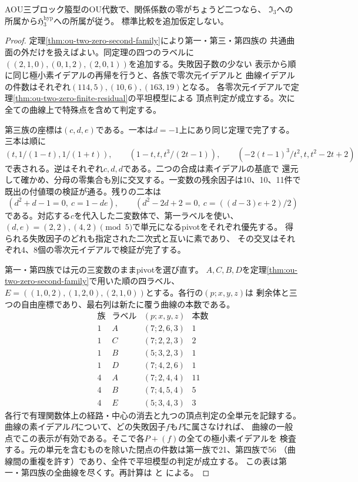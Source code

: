 \begin{theorem}[AOU二零台の全特殊化]
\label{thm:ou-two-zero-all}
AOU三ブロック箙型のOU代数で、関係係数の零がちょうど二つなら、
$\mathfrak I_3$への所属から$\mathfrak H^{\mathrm{hyp}}_3$への所属が従う。
標準比較を追加仮定しない。
\end{theorem}
\begin{proof}
定理\ref{thm:ou-two-zero-second-family}により第一・第三・第四族の
共通曲面の外だけを扱えばよい。同定理の四つのラベルに
$((2,1,0),(0,1,2),(2,0,1))$を追加する。失敗因子数の少ない
表示から順に同じ極小素イデアルの再帰を行うと、各族で零次元イデアルと
曲線イデアルの件数はそれぞれ$(114,5),(10,6),(163,19)$となる。
各零次元イデアルで定理\ref{thm:ou-two-zero-finite-residual}の平坦模型による
頂点判定が成立する。次に全ての曲線上で特殊点を含めて判定する。

第三族の座標は$(c,d,e)$である。一本は$d=-1$上にあり同じ定理で完了する。
三本は順に
\[
 (t,1/(1-t),1/(1+t)),\qquad (1-t,t,t^3/(2t-1)),\qquad
 (-2(t-1)^3/t^2,t,t^2-2t+2)
\]
で表される。逆はそれぞれ$c,d,d$である。二つの合成は素イデアルの基底で
還元して確かめ、分母の零集合も別に交叉する。一変数の残余因子は10、10、11件で
既出の付値環の検証が通る。残りの二本は
\[
 (d^2+d-1=0,\ c=1-de),\qquad
 (d^2-2d+2=0,\ c=((d-3)e+2)/2)
\]
である。対応する$c$を代入した二変数体で、第一ラベルを使い、
$(d,e)=(2,2),(4,2)\pmod5$で単元になるpivotをそれぞれ優先する。
得られる失敗因子のどれも指定された二次式と互いに素であり、
その交叉はそれぞれ4、8個の零次元イデアルで検証が完了する。

第一・第四族では元の三変数のままpivotを選び直す。
$A,C,B,D$を定理\ref{thm:ou-two-zero-second-family}で用いた順の四ラベル、
$E=((1,0,2),(1,2,0),(2,1,0))$とする。各行の$(p;x,y,z)$は
剰余体と三つの自由座標であり、最右列は新たに覆う曲線の本数である。
\[
\begin{array}{c|c|c|c}
\text{族}&\text{ラベル}&(p;x,y,z)&\text{本数}\\\hline
1&A&(7;2,6,3)&1\\
1&C&(7;2,2,3)&2\\
1&B&(5;3,2,3)&1\\
1&D&(7;4,2,6)&1\\\hline
4&A&(7;2,4,4)&11\\
4&B&(7;4,5,4)&5\\
4&E&(5;3,4,3)&3
\end{array}
\]
各行で有理関数体上の経路・中心の消去と九つの頂点判定の全単元を記録する。
曲線の素イデアル$P$について、どの失敗因子$f$も$P$に属さなければ、
曲線の一般点でこの表示が有効である。そこで各$P+(f)$の全ての極小素イデアルを
検査する。元の単元を含むものを除いた閉点の件数は第一族で21、第四族で56
（曲線間の重複を許す）であり、全件で平坦模型の判定が成立する。
この表は第一・第四族の全曲線を尽くす。再計算は
と
による。
\end{proof}

